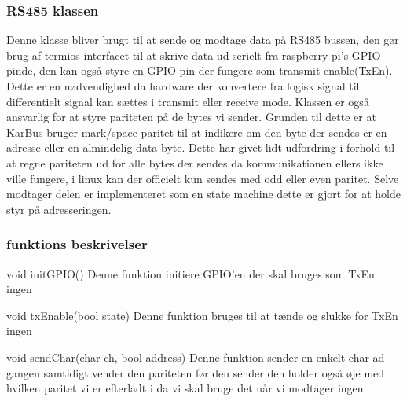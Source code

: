 {
}

\subsubsection{RS485 klassen}
Denne klasse bliver brugt til at sende og modtage data på RS485 bussen, den gør brug af termios interfacet til at skrive data ud serielt fra raspberry pi's GPIO pinde, den kan også styre en GPIO pin der fungere som transmit enable(TxEn). Dette er en nødvendighed da hardware der konvertere fra logisk signal til differentielt signal kan sættes i transmit eller receive mode. Klassen er også ansvarlig for at styre pariteten på de bytes vi sender. Grunden til dette er at KarBus bruger mark/space paritet til at indikere om den byte der sendes er en adresse eller en almindelig data byte. Dette har givet lidt udfordring i forhold til at regne pariteten ud for alle bytes der sendes da kommunikationen ellers ikke ville fungere, i linux kan der officielt kun sendes med odd eller even paritet.
Selve modtager delen er implementeret som en state machine dette er gjort for at holde styr på adresseringen.


\subsubsection{funktions beskrivelser}

\funk
{void initGPIO()}
{Denne funktion initiere GPIO'en der skal bruges som TxEn}
{ingen}
{
}

\funk
{void txEnable(bool state)}
{Denne funktion bruges til at tænde og slukke for TxEn}
{ingen}
{
}

\funk
{void sendChar(char ch, bool address)}
{Denne funktion sender en enkelt char ad gangen samtidigt vender den pariteten før den sender den holder også øje med hvilken paritet vi er efterladt i da vi skal bruge det når vi modtager}
{ingen}
{
}

